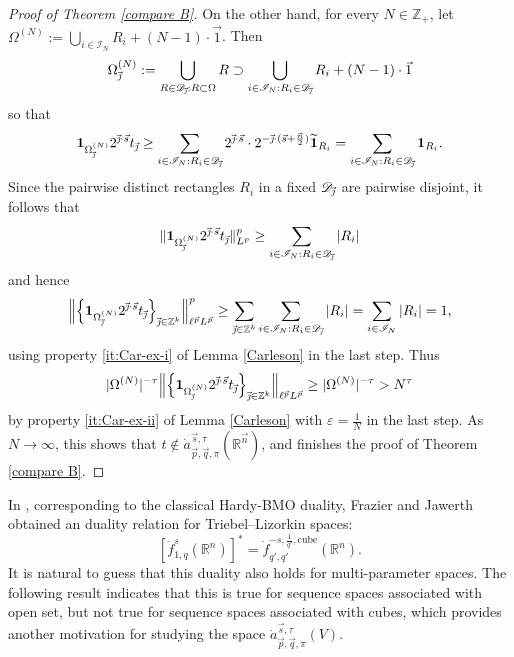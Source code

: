 \documentclass[11pt, reqno]{amsart}
\theoremstyle{definition}
\theoremstyle{remark}
\numberwithin{equation}{section}
\newcommand{\Z}{\mathbb Z}
\newcommand{\vj}{\vec{\textit{\j}}}
\newcommand{\vn}{\vec n}
\newcommand{\eps}{\varepsilon}
\newcommand{\one}{\mathbf{1}}
\newcommand{\abs}[1]{|#1|}
\newcommand{\Norm}[2]{\|#1\|_{#2}}
\begin{document}
\begin{proof}[Proof of Theorem \ref{compare B}]
On the other hand, for every $N\in\mathbb Z_+$,
let $\Omega^{(N)}:=\bigcup_{i\in\mathscr I_N} R_i+ (N-1)\cdot \vec 1 $. Then
\begin{equation*}
  \Omega^{(N)}_{\vj}
  :=\bigcup_{R\in\mathscr D_{\vj}:R\subset\Omega}R
  \supset\bigcup_{i\in\mathscr I_N:R_i\in\mathscr D_{\vj}} R_i+ (N-1)\cdot \vec 1
\end{equation*}
so that
\begin{equation*}
  \one_{\Omega^{(N)}_{\vj}} 2^{\vj\cdot\vec s}t_{\vj}
  \geq \sum_{i\in\mathscr I_N:R_i\in\mathscr D_{\vj}}
    2^{\vj\cdot\vec s}\cdot 2^{-\vj\cdot(\vec s+\frac{\vn}{2})}\widetilde{\one}_{R_i}
   =\sum_{i\in\mathscr I_N:R_i\in\mathscr D_{\vj}}\one_{R_i}.
\end{equation*}
Since the pairwise distinct rectangles $R_i$ in a fixed $\mathscr D_{\vj}$ are pairwise disjoint, it follows that
\begin{equation*}
  \Norm{\one_{\Omega^{(N)}_{\vj}} 2^{\vj\cdot\vec s}t_{\vj}}{L^p}^p
  \geq \sum_{i\in\mathscr I_N:R_i\in\mathscr D_{\vj}}\abs{R_i}
\end{equation*}
and hence
\begin{equation*}
  \Big\|\Big\{\one_{\Omega^{(N)}_{\vj}} 2^{\vj\cdot\vec s}
    t_{\vj}\Big\}_{\vj\in\mathbb Z^k}\Big\|_{\ell^{\vec p}L^{\vec p}}^p
   \geq
   \sum_{\vj\in\Z^k}\sum_{i\in\mathscr I_N:R_i\in\mathscr D_{\vj}}\abs{R_i}
   =\sum_{i\in\mathscr I_N}\abs{R_i}=1,
\end{equation*}
using property \eqref{it:Car-ex-i} of Lemma \ref{Carleson} in the last step. Thus
\begin{align*}
|\Omega^{(N)}|^{-\tau}
\Big\|\Big\{\one_{\Omega^{(N)}_{\vj}} 2^{\vj\cdot\vec s}
t_{\vj}\Big\}_{\vj\in\mathbb Z^k}\Big\|_{\ell^{\vec p}L^{\vec p}}
\geq\abs{\Omega^{(N)}}^{-\tau}
>N^{\tau}
\end{align*}
by property \eqref{it:Car-ex-ii} of Lemma \ref{Carleson} with $\eps=\frac{1}{N}$ in the last step.
As  $N\to\infty$, this shows that $t\notin \dot a^{\vec s,\tau}_{\vec p,\vec q,\pi}(\mathbb R^{\vec n})$,
and finishes the proof of Theorem \ref{compare B}.
\end{proof}

In \cite[Theorem 5.9]{FJ90}, corresponding to the classical Hardy-BMO duality,
Frazier and Jawerth obtained an duality relation for Triebel--Lizorkin spaces:
$$
[\dot f_{1,q}^{s}(\mathbb R^n)]^*=\dot f_{q',q'}^{-s,\frac1{q'},\mathrm{cube}}(\mathbb R^n).
$$
It is natural to guess that this duality also holds for multi-parameter spaces.
The following result indicates that this is true for sequence spaces associated
with open set, but not true for sequence spaces associated with cubes, which
provides another motivation for studying the space
$\dot a^{\vec s,\tau}_{\vec p,\vec q,\pi}(V)$.
\end{document}
